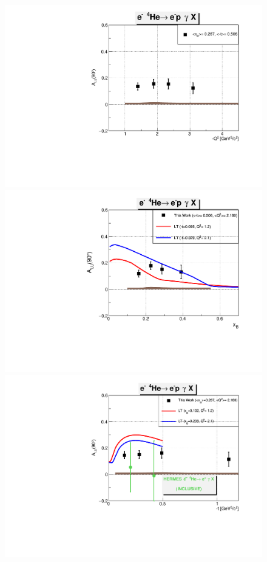 \begin{figure}[tpb]
   \centering
\includegraphics[scale=0.37]{fig_updated/f_incoh_alu_Q2_90.pdf}\\ 
\includegraphics[scale=0.37]{fig_updated/f_incoh_alu_xB_90.pdf}\\
\includegraphics[scale=0.37]{fig_updated/f_incoh_alu_t_90.pdf} \\ 

\end{figure}
